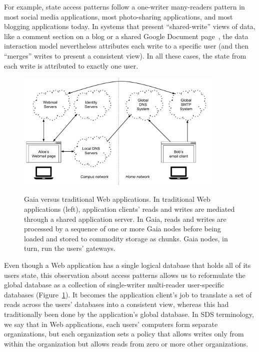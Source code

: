 For example, state access patterns follow a one-writer many-readers pattern
in most social media applications, most photo-sharing applications, and most
blogging applications today.
In systems that present ``shared-write'' views of data, like a comment section on a blog or
a shared Google Document page~\cite{google-docs}, the data interaction model
nevertheless attributes each write to a specific user (and then ``merges''
writes to present a consistent view).  In all these cases, the state from each write is
attributed to exactly one user.

\begin{figure}[h]
   \caption{Gaia versus traditional Web applications.  In traditional Web
   applications (left), application clients' reads and writes are mediated
   through a shared application server.  In Gaia, reads and writes are processed
   by a sequence of one or more Gaia nodes before being loaded and stored to
   commodity storage as chunks.  Gaia nodes, in turn, run the users' gateways.}
   \centering
   \includegraphics[width=0.9\textwidth,page=16]{figures/dissertation-figures}
   \label{fig:chap3-gaia-vs-traditional-web}
\end{figure}

Even though a Web application has a single logical database that holds all of
its users state, this observation about access patterns allows us to reformulate
the global database as a collection of single-writer multi-reader user-specific
databases (Figure~\ref{fig:chap3-gaia-vs-traditional-web}).
It becomes the application client's job to translate a set of reads across
the users' databases into a consistent view, whereas this had traditionally been
done by the application's global database.  In SDS terminology, we say that in
Web applications, each users' computers form separate organizations, but each
organization sets a policy that allows writes only from within the organization
but allows reads from zero or more other organizations.

